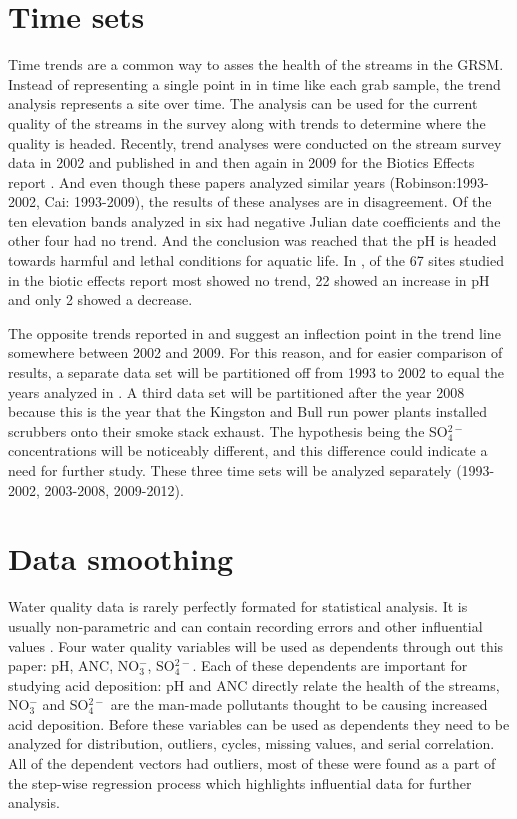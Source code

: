 \section{Time sets}

Time trends are a common way to asses the health of the streams in the GRSM.
Instead of representing a single point in in time like each grab sample, the trend analysis represents a site over time.
The analysis can be used for the current quality of the streams in the survey along with trends to determine where the quality is headed. 
Recently, trend analyses were conducted on the stream survey data in 2002 and published in \citet{robinson2008ph} and then again in 2009 for the Biotics Effects report \citep{cai2013}.
And even though these papers analyzed similar years (Robinson:1993-2002, Cai: 1993-2009), the results of these analyses are in disagreement.
Of the ten elevation bands analyzed in \citet{robinson2008ph} six had negative Julian date coefficients and the other four had no trend.
And the conclusion was reached that the pH is headed towards harmful and lethal conditions for aquatic life. 
In \citet{cai2013}, of the 67 sites studied in the biotic effects report most showed no trend, 22 showed an increase in pH and only 2 showed a decrease. 

The opposite trends reported in  \citet{robinson2008ph} and \citet{cai2013} suggest an inflection point in the trend line somewhere between 2002 and 2009. 
For this reason, and for easier comparison of results,  a separate data set will be partitioned off from 1993 to 2002 to equal the years analyzed in \citet{robinson2008ph}.  
A third data set will be partitioned after the year 2008 because this is the year that the Kingston and Bull run power plants installed scrubbers onto their smoke stack exhaust. 
The hypothesis being the SO$_4^{2-}$ concentrations will be noticeably different, and this difference could indicate a need for further study. 
These three time sets will be analyzed separately (1993-2002, 2003-2008, 2009-2012).

\section{Data smoothing}%

Water quality data is rarely perfectly formated for statistical analysis.
It is usually  non-parametric and can contain recording errors and other influential values \citep{helsel1992statistical}.
Four water quality variables will be used as dependents through out this paper: pH, ANC, NO$_3^-$, SO$_4^{2-}$.
Each of these dependents are important for studying acid deposition: pH and ANC directly relate the health of the streams, NO$_3^-$ and SO$_4^{2-}$ are the man-made pollutants thought to be causing increased acid deposition.
Before these variables can be used as dependents they need to be analyzed for distribution, outliers, cycles, missing values, and serial correlation\citep{helsel1992statistical}.
All of the dependent vectors had outliers, most of these were found as a part of the step-wise regression process which highlights influential data for further analysis.

